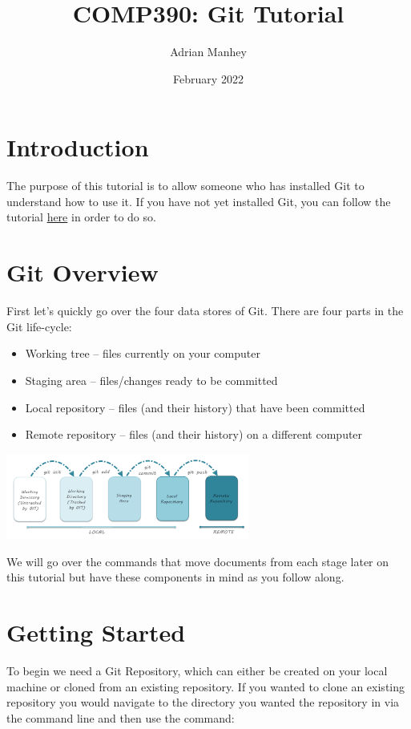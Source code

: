 \documentclass{article}
\title{COMP390: Git Tutorial}
\author{Adrian Manhey}
\date{February 2022}
\begin{document}
\maketitle

\section{Introduction}

The purpose of this tutorial is to allow someone who has installed Git to understand how to use it. If you have not yet installed Git, you can follow the tutorial \href{https://git-scm.com/book/en/v2/Getting-Started-Installing-Git}{here} in order to do so.

\section{Git Overview}
First let's quickly go over the four data stores of Git. There are four parts in the Git life-cycle:

\begin{itemize}
    \item Working tree – files currently on your computer
    \item Staging area – files/changes ready to be committed
    \item Local repository – files (and their history) that have been committed
    \item Remote repository – files (and their history) on a different computer
\end{itemize}

\begin{center}
    \includegraphics[width=8cm]{4 Git Life Cycle.png}
\end{center}

We will go over the commands that move documents from each stage later on this tutorial but have these components in mind as you follow along.
\section{Getting Started}

To begin we need a Git Repository, which can either be created on your local machine or cloned from an existing repository. If you wanted to clone an existing repository you would navigate to the directory you wanted the repository in via the command line and then use the command:
\end{document}
